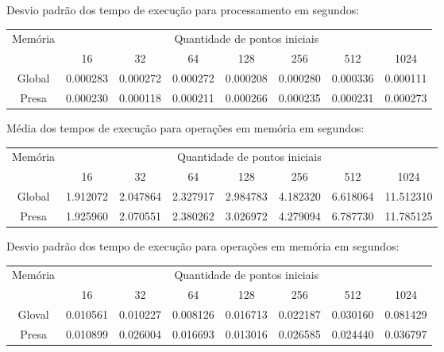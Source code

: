   \newpage
  \begin{small}
  \noindent Desvio padrão dos tempo de execução para processamento em segundos:\\
  \begin{tabular}{| c | c | c | c | c | c | c | c |}
    \hline
    \multirow{2}{*}{Memória}& \multicolumn{7}{|c|}{Quantidade de pontos iniciais} \\ \cline{2-8}
    & 16 & 32 & 64 & 128 & 256 & 512 & 1024\\ \hline
    Global & 0.000283 & 0.000272 & 0.000272 & 0.000208 & 0.000280 & 0.000336 & 0.000111\\ \hline
    Presa & 0.000230 & 0.000118 & 0.000211 & 0.000266 & 0.000235 & 0.000231 & 0.000273\\ \hline

    \hline
  \end{tabular}
  \end{small}
  
  \hspace{1mm}\newline
  
  \begin{small}
  \noindent Média dos tempos de execução para operações em memória em segundos:\\
  \begin{tabular}{| c | c | c | c | c | c | c | c |}
    \hline
    \multirow{2}{*}{Memória}& \multicolumn{7}{|c|}{Quantidade de pontos iniciais} \\ \cline{2-8}
    & 16 & 32 & 64 & 128 & 256 & 512 & 1024 \\ \hline
    Global & 1.912072 & 2.047864 & 2.327917 & 2.984783 & 4.182320 & 6.618064 & 11.512310 \\ \hline
    Presa & 1.925960 & 2.070551 & 2.380262 & 3.026972 & 4.279094 & 6.787730 & 11.785125\\ \hline
  \end{tabular}
  \end{small}
  
  \hspace{1mm}\newline
  
  \noindent Desvio padrão dos tempo de execução para operações em memória em segundos:\\
  \begin{tabular}{| c | c | c | c | c | c | c | c |}
    \hline
    \multirow{2}{*}{Memória}& \multicolumn{7}{|c|}{Quantidade de pontos iniciais} \\ \cline{2-8}
    & 16 & 32 & 64 & 128 & 256 & 512 & 1024\\ \hline
    Gloval & 0.010561 & 0.010227 & 0.008126 & 0.016713 & 0.022187 & 0.030160 & 0.081429\\ \hline
    Presa & 0.010899 & 0.026004 & 0.016693 & 0.013016 & 0.026585 & 0.024440 & 0.036797\\ \hline
  \end{tabular}
  
